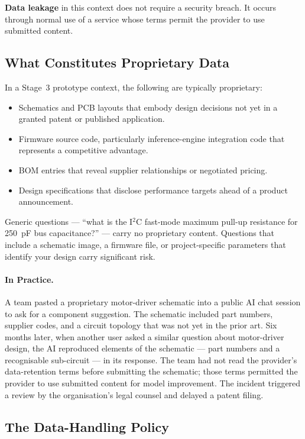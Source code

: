 \textbf{Data leakage} in this context does not require a
security breach.
It occurs through normal use of a service whose terms permit the provider to
use submitted content.

\subsection{What Constitutes Proprietary Data}
\label{sec:ch8-ip-what}

In a Stage~3 prototype context, the following are typically proprietary:
\begin{itemize}
  \item Schematics and PCB layouts that embody design decisions not yet in a
        granted patent or published application.
  \item Firmware source code, particularly inference-engine integration code
        that represents a competitive advantage.
  \item BOM entries that reveal supplier relationships or negotiated pricing.
  \item Design specifications that disclose performance targets ahead of a
        product announcement.
\end{itemize}

Generic questions --- ``what is the I$^2$C fast-mode maximum pull-up resistance
for 250~pF bus capacitance?'' --- carry no proprietary content.
Questions that include a schematic image, a firmware file, or project-specific
parameters that identify your design carry significant risk.

\paragraph{In Practice.}
A team pasted a proprietary motor-driver schematic into a public AI chat
session to ask for a component suggestion.
The schematic included part numbers, supplier codes, and a circuit topology
that was not yet in the prior art.
Six months later, when another user asked a similar question about motor-driver
design, the AI reproduced elements of the schematic --- part numbers and
a recognisable sub-circuit --- in its response.
The team had not read the provider's data-retention terms before submitting
the schematic; those terms permitted the provider to use submitted content
for model improvement.
The incident triggered a review by the organisation's legal counsel and
delayed a patent filing.

\subsection{The Data-Handling Policy}
\label{sec:ch8-ip-policy}

